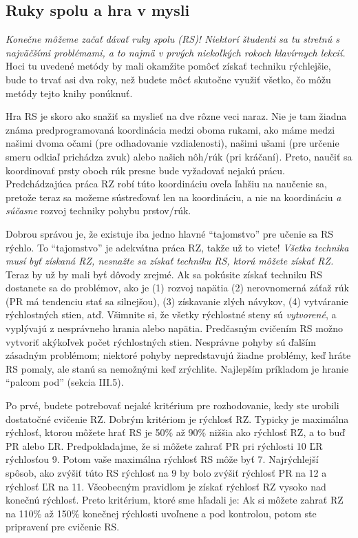 \subsection{Ruky spolu a hra v mysli}
\emph{Konečne môžeme začať dávať ruky spolu (RS)! Niektorí študenti sa tu stretnú s najväčšími problémami, a to najmä v prvých niekoľkých rokoch klavírnych lekcií.} Hoci tu uvedené metódy by mali okamžite pomôcť získať techniku rýchlejšie, bude to trvať asi dva roky, než budete môcť skutočne využiť všetko, čo môžu metódy tejto knihy ponúknuť.

Hra RS je skoro ako snažiť sa myslieť na dve rôzne veci naraz. Nie je tam žiadna známa predprogramovaná koordinácia medzi oboma rukami, ako máme medzi našimi dvoma očami (pre odhadovanie vzdialenosti), našimi ušami (pre určenie smeru odkiaľ prichádza zvuk) alebo našich nôh/rúk (pri kráčaní). Preto, naučiť sa koordinovať prsty oboch rúk presne bude vyžadovať nejakú prácu. Predchádzajúca práca RZ robí túto koordináciu oveľa ľahšiu na naučenie sa, pretože teraz sa možeme sústreďovať len na koordináciu, a nie na koordináciu \textit{a súčasne} rozvoj techniky pohybu prstov/rúk.

Dobrou správou je, že existuje iba jedno hlavné “tajomstvo” pre učenie sa RS rýchlo. To “tajomstvo” je adekvátna práca RZ, takže už to viete! \emph{Všetka technika musí byť získaná RZ, nesnažte sa získať techniku RS, ktorú môžete získať RZ.} Teraz by už by mali byť dôvody zrejmé. Ak sa pokúsite získať techniku RS dostanete sa do problémov, ako je (1) rozvoj napätia (2) nerovnomerná záťaž rúk (PR má tendenciu stať sa silnejšou), (3) získavanie zlých návykov, (4) vytváranie rýchlostných stien, atď. Všimnite si, že všetky rýchlostné steny sú \textit{vytvorené}, a vyplývajú z nesprávneho hrania alebo napätia. Predčasným cvičením RS možno vytvoriť akýkoľvek počet rýchlostných stien. Nesprávne pohyby sú ďalším zásadným problémom; niektoré pohyby nepredstavujú žiadne problémy, keď hráte RS pomaly, ale stanú sa nemožnými keď zrýchlite. Najlepším príkladom je hranie “palcom pod” (sekcia III.5).

Po prvé, budete potrebovať nejaké kritérium pre rozhodovanie, kedy ste urobili dostatočné cvičenie RZ. Dobrým kritériom je rýchlosť RZ. Typicky je maximálna rýchlosť, ktorou môžete hrať RS je 50\% až 90\% nižšia ako rýchlosť RZ, a to buď PR alebo ĽR. Predpokladajme, že si môžete zahrať PR pri rýchlosti 10 ĽR rýchlosťou 9. Potom vaše maximálna rýchlosť RS môže byť 7. Najrýchlejší spôsob, ako zvýšiť túto RS rýchlosť na 9 by bolo zvýšiť rýchlosť PR na 12 a rýchlosť ĽR na 11. Všeobecným pravidlom je získať rýchlosť RZ vysoko nad konečnú rýchlosť. Preto kritérium, ktoré sme hľadali je: Ak si môžete zahrať RZ na 110\% až 150\% konečnej rýchlosti uvoľnene a pod kontrolou, potom ste pripravení pre cvičenie RS.

